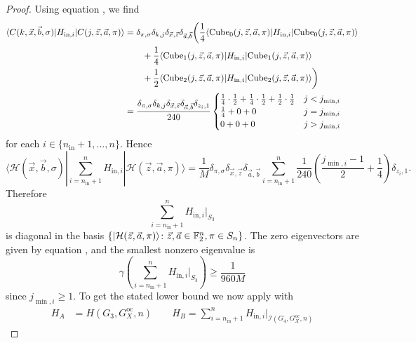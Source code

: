 \documentclass[../thesis-main/thesis-main]{subfiles}
\begin{document}
\begin{proof}
Using equation , we find
\begin{align}
\langle C(k,\vec{x},\vec{b},\sigma)|H_{\text{in},i}|C(j,\vec{z},\vec{a},\pi)\rangle
&=\delta_{\pi,\sigma}\delta_{k,j} \delta_{\vec{x},\vec{z}}\delta_{\vec{a},\vec{b}}\bigg(\frac{1}{4}\langle {\operatorname{Cube}_0(j,\vec{z},\vec{a},\pi)}|H_{\text{in},i}|{\operatorname{Cube}_0(j,\vec{z},\vec{a},\pi)}\rangle\nonumber\\
&\qquad+\frac{1}{4}\langle {\operatorname{Cube}_1(j,\vec{z},\vec{a},\pi)}|H_{\text{in},i}| {\operatorname{Cube}_1(j,\vec{z},\vec{a},\pi)}\rangle \nonumber\\
&\qquad+\frac{1}{2}\langle {\operatorname{Cube}_2(j,\vec{z},\vec{a},\pi)}|H_{\text{in},i}| {\operatorname{Cube}_2(j,\vec{z},\vec{a},\pi)}\rangle\bigg)\\
&=\frac{\delta_{\pi,\sigma}\delta_{k,j} \delta_{\vec{x},\vec{z}}\delta_{\vec{a},\vec{b}}\delta_{z_i,1}}{240}\begin{cases}
\frac{1}{4}\cdot\frac{1}{2}+\frac{1}{4}\cdot\frac{1}{2}+\frac{1}{2}\cdot\frac{1}{2} & j<j_{\min,i}\\
\frac{1}{4}+0+0 & j=j_{\min,i}\\
0+0+0 & j>j_{\min,i}
\end{cases}
\end{align}
for each $i\in\{n_{\text{in}}+1,\ldots,n\}$. Hence 
\begin{equation}
\langle\mathcal{H}(\vec{x},\vec{b},\sigma)|\sum_{i=n_{\text{in}}+1}^{n}H_{\text{in},i}|\mathcal{H}(\vec{z},\vec{a},\pi)\rangle=\frac{1}{M}\delta_{\pi,\sigma}\delta_{\vec{x},\vec{z}}\delta_{\vec{a},\vec{b}}\sum_{i=n_{\text{in}}+1}^{n}\frac{1}{240}\left(\frac{j_{\min,i}-1}{2}+\frac{1}{4}\right)\delta_{z_{i},1}.
\end{equation}
Therefore
\begin{equation}
\sum_{i=n_{\text{in}}+1}^{n}H_{\text{in},i}\big|_{S_{3}}
\end{equation}
is diagonal in the basis $\{|\mathcal{H}(\vec{z},\vec{a},\pi)\rangle\colon\vec{z},\vec{a}\in\mathbb{F}_2^{n},\pi\in S_n\}$. The zero eigenvectors are given by equation , and the smallest nonzero eigenvalue is
\begin{equation}
\gamma\left(\sum_{i=n_{\text{in}}+1}^{n}H_{\text{in},i}\big|_{S_{3}}\right)\geq\frac{1}{960M}\label{eq:lbnd_Hinj}
\end{equation}
since $j_{\min,i}\geq1$. To get the stated lower bound we now apply  with 
\begin{align}
H_{A} & =H(G_{3},G_X^{\text{oc}},n)\qquad H_{B}=\sum_{i=n_{\text{in}}+1}^{n}H_{\text{in},i}\big|_{\mathcal{I}(G_{4},G_X^{\text{oc}},n)}

\end{align}
\end{proof}
\end{document}
